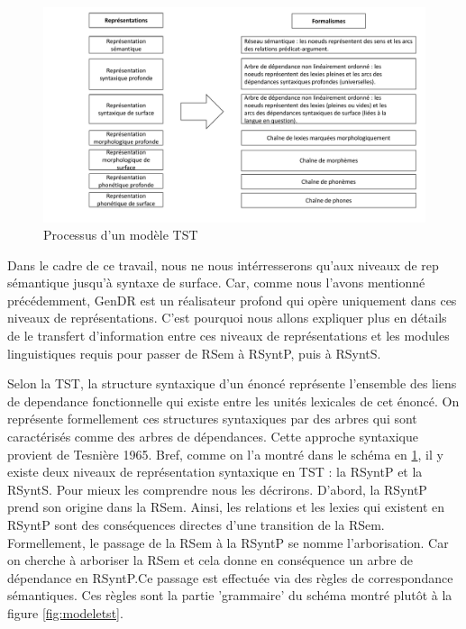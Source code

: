 \begin{figure}[htb]
	\centering
	\includegraphics[width=1\textwidth, trim = {0cm 0cm 0cm 0cm},clip]{ch3/figs/polguere2.pdf}
	\caption{Processus d'un modèle TST}
	\label{fig:processustst}
\end{figure}

Dans le cadre de ce travail, nous ne nous intérresserons qu'aux niveaux de rep sémantique jusqu'à syntaxe de surface. Car, comme nous l'avons mentionné précédemment, GenDR est un réalisateur profond qui opère uniquement dans ces niveaux de représentations. C'est pourquoi nous allons expliquer plus en détails de le transfert d'information entre ces niveaux de représentations et les modules linguistiques requis pour passer de RSem à RSyntP, puis à RSyntS.

Selon la TST, la structure syntaxique d'un énoncé représente l'ensemble des liens de dependance fonctionnelle qui existe entre les unités lexicales de cet énoncé. On représente formellement ces structures syntaxiques par des arbres qui sont caractérisés comme des arbres de dépendances. Cette approche syntaxique provient de Tesnière 1965. Bref, comme on l'a montré dans le schéma en \ref{fig:processustst}, il y existe deux niveaux de représentation syntaxique en TST : la RSyntP et la RSyntS. Pour mieux les comprendre nous les décrirons. D'abord, la RSyntP prend son origine dans la RSem. Ainsi, les relations et les lexies qui existent en RSyntP sont des conséquences directes d'une transition de la RSem. Formellement, le passage de la RSem à la RSyntP se nomme l'arborisation. Car on cherche à arboriser la RSem et cela donne en conséquence un arbre de dépendance en RSyntP.Ce passage est effectuée via des règles de correspondance sémantiques. Ces règles sont la partie 'grammaire' du schéma montré plutôt à la figure \ref{fig:modeletst}.

